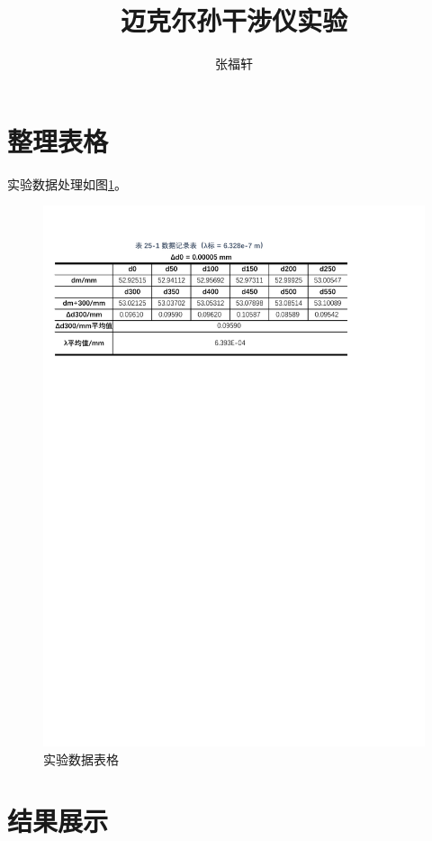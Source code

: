 \documentclass[12pt]{article}
\title{迈克尔孙干涉仪实验} %
\author{张福轩}
\begin{document}
\maketitle

\section{\normalfont 整理表格}
实验数据处理如图\ref{fig:table_data}。

\begin{figure}[H] %
    \centering
    \includegraphics[width=\textwidth]{./figures/迈克尔逊.pdf} 
    \caption{实验数据表格}
    \label{fig:table_data}
\end{figure}

\section{\normalfont 结果展示}
\end{document}

